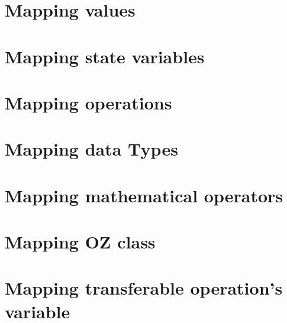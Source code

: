 \section{Mapping values}
\label{sec_tra_mapping_values}


\section{Mapping state variables}
\label{sec_tra_mapping_state_variables}


\section{Mapping operations}
\label{sec_tra_mapping_operation}


\section{Mapping data Types}
\label{sec_tra_mapping_data_types}


\section{Mapping mathematical operators}
\label{sec_tra_mapping_mathematical_operations}



\section{Mapping OZ class}
\label{sec_tra_mapping_class}


\section{Mapping transferable operation's variable}
\label{sec_tra_mapping_transferable_operation}


